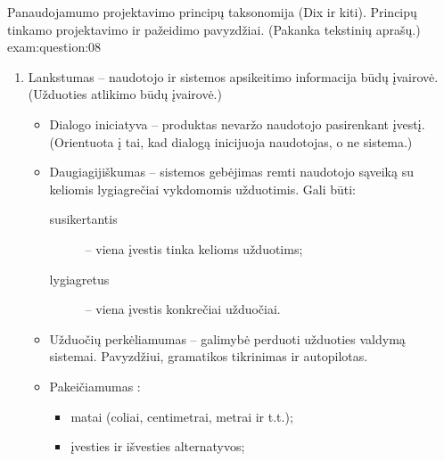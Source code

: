 \begin{question}{%
  Panaudojamumo projektavimo principų taksonomija (Dix ir kiti).
  Principų tinkamo projektavimo ir pažeidimo pavyzdžiai. (Pakanka
  tekstinių aprašų.)
  }{exam:question:08}
\begin{enumerate}
\begin{itemize}
        \item Darna :
          \begin{itemize}
            \item vienoje sistemoje – panašūs veiksmai įvairiose sistemos
              vietose atliekami vienodai;
            \item platformoje;
            \item darbo aplinkoje – atitikimas platformos (operacinės
              sistemos) stiliui, žinios gautos naudojant kitas tos
              OS programas turi būti pritaikomos ir naujajai;
            \item metaforose – veiksmai su virtualiais objektais
              neturi prieštarauti realiame pasaulyje vykdomiems veiksmams.
          \end{itemize}
      \end{itemize}
    \item Lankstumas  – naudotojo ir sistemos apsikeitimo
      informacija būdų įvairovė. (Užduoties atlikimo būdų įvairovė.)
      \begin{itemize}
        \item Dialogo iniciatyva  – produktas
          nevaržo naudotojo pasirenkant įvestį. (Orientuota į
          tai, kad dialogą inicijuoja naudotojas, o ne sistema.)
        \item Daugiagijiškumas  – sistemos gebėjimas
          remti naudotojo sąveiką su keliomis lygiagrečiai vykdomomis
          užduotimis. Gali būti:
          \begin{description}
            \item[susikertantis ] – viena įvestis tinka
              kelioms užduotims;
            \item[lygiagretus ] – viena įvestis konkrečiai
              užduočiai.
          \end{description}
        \item Užduočių perkėliamumas  – galimybė
          perduoti užduoties valdymą sistemai. Pavyzdžiui, gramatikos
          tikrinimas ir autopilotas.
        \item Pakeičiamumas :
          \begin{itemize}
            \item matai (coliai, centimetrai, metrai ir t.t.);
            \item įvesties ir išvesties alternatyvos;

\end{itemize}
\end{itemize}
\end{enumerate}
\end{question}
